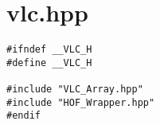 \section{vlc.hpp}
\begin{verbatim}
#ifndef __VLC_H
#define __VLC_H

#include "VLC_Array.hpp"
#include "HOF_Wrapper.hpp"
#endif
\end{verbatim}	